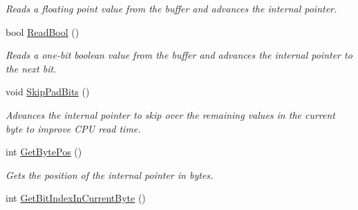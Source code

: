\begin{DoxyCompactItemize}
\begin{DoxyCompactList}\small\item\em Reads a floating point value from the buffer and advances the internal pointer. \end{DoxyCompactList}\item 
\hypertarget{class_rhesus_1_1_toolkit_1_1_net_1_1_net_buffer_a3829db0150a4700c80e2f7f688dfe207}{bool \hyperlink{class_rhesus_1_1_toolkit_1_1_net_1_1_net_buffer_a3829db0150a4700c80e2f7f688dfe207}{Read\-Bool} ()}\label{class_rhesus_1_1_toolkit_1_1_net_1_1_net_buffer_a3829db0150a4700c80e2f7f688dfe207}

\begin{DoxyCompactList}\small\item\em Reads a one-\/bit boolean value from the buffer and advances the internal pointer to the next bit. \end{DoxyCompactList}\item 
\hypertarget{class_rhesus_1_1_toolkit_1_1_net_1_1_net_buffer_a0736e0e1bc136c8e2bf3f6eee2798ace}{void \hyperlink{class_rhesus_1_1_toolkit_1_1_net_1_1_net_buffer_a0736e0e1bc136c8e2bf3f6eee2798ace}{Skip\-Pad\-Bits} ()}\label{class_rhesus_1_1_toolkit_1_1_net_1_1_net_buffer_a0736e0e1bc136c8e2bf3f6eee2798ace}

\begin{DoxyCompactList}\small\item\em Advances the internal pointer to skip over the remaining values in the current byte to improve C\-P\-U read time. \end{DoxyCompactList}\item 
\hypertarget{class_rhesus_1_1_toolkit_1_1_net_1_1_net_buffer_aedee90a5049558678700bc9a2d5c16a5}{int \hyperlink{class_rhesus_1_1_toolkit_1_1_net_1_1_net_buffer_aedee90a5049558678700bc9a2d5c16a5}{Get\-Byte\-Pos} ()}\label{class_rhesus_1_1_toolkit_1_1_net_1_1_net_buffer_aedee90a5049558678700bc9a2d5c16a5}

\begin{DoxyCompactList}\small\item\em Gets the position of the internal pointer in bytes. \end{DoxyCompactList}\item 
\hypertarget{class_rhesus_1_1_toolkit_1_1_net_1_1_net_buffer_ad2212b7f38393e98fb2ad63113d4e82e}{int \hyperlink{class_rhesus_1_1_toolkit_1_1_net_1_1_net_buffer_ad2212b7f38393e98fb2ad63113d4e82e}{Get\-Bit\-Index\-In\-Current\-Byte} ()}\label{class_rhesus_1_1_toolkit_1_1_net_1_1_net_buffer_ad2212b7f38393e98fb2ad63113d4e82e}


\end{DoxyCompactItemize}
